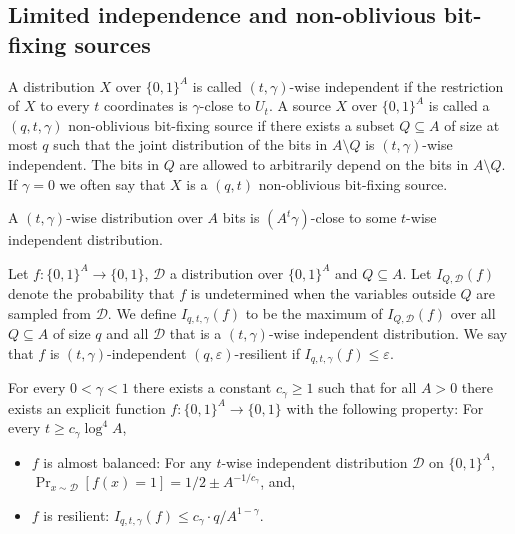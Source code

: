 \subsection*{Limited independence and non-oblivious bit-fixing sources}
\begin{definition}
A distribution $X$ over $\{0,1\}^A$ is called $(t,\gamma)$-wise independent if the restriction of $X$ to every $t$ coordinates is $\gamma$-close to $U_t$. A source $X$ over $\{0,1\}^A$ is called a $(q,t,\gamma)$ non-oblivious bit-fixing source if there exists a subset $Q\subseteq A$ of size at most $q$ such that the joint distribution of the bits in $A\setminus Q$ is $(t,\gamma)$-wise independent. The bits in $Q$ are allowed to arbitrarily depend on the bits in $A\setminus Q$. If $\gamma=0$ we often say that $X$ is a $(q,t)$ non-oblivious bit-fixing source.
\end{definition}
\begin{lemma}[{[3]}]A $(t,\gamma)$-wise distribution over $A$ bits is $(A^t\gamma)$-close to some $t$-wise independent distribution.\end{lemma}
\begin{definition}
Let $f:\{0,1\}^A\to\{0,1\}$, $\mathcal D$ a distribution over $\{0,1\}^A$ and $Q\subseteq A$. Let $I_{Q,\mathcal D}(f)$ denote the probability that $f$ is undetermined when the variables outside $Q$ are sampled from $\mathcal D$. We define $I_{q,t,\gamma}(f)$ to be the maximum of $I_{Q,\mathcal D}(f)$ over all $Q\subseteq A$ of size $q$ and all $\mathcal D$ that is a $(t,\gamma)$-wise independent distribution. We say that $f$ is $(t,\gamma)$-independent $(q,\varepsilon)$-resilient if $I_{q,t,\gamma}(f)\le\varepsilon$.
\end{definition}
\begin{theorem}[{[9,32]}]
For every $0<\gamma<1$ there exists a constant $c_\gamma\ge1$ such that for all $A>0$ there exists an explicit function $f:\{0,1\}^A\to\{0,1\}$ with the following property: For every $t\ge c_\gamma\log^4 A$,
\begin{itemize}
\item $f$ is almost balanced: For any $t$-wise independent distribution $\mathcal D$ on $\{0,1\}^A$, $\Pr_{x\sim\mathcal D}[f(x)=1]=1/2\pm A^{-1/c_\gamma}$, and,
\item $f$ is resilient: $I_{q,t,\gamma}(f)\le c_\gamma\cdot q/A^{1-\gamma}$.
\end{itemize}
\end{theorem}
